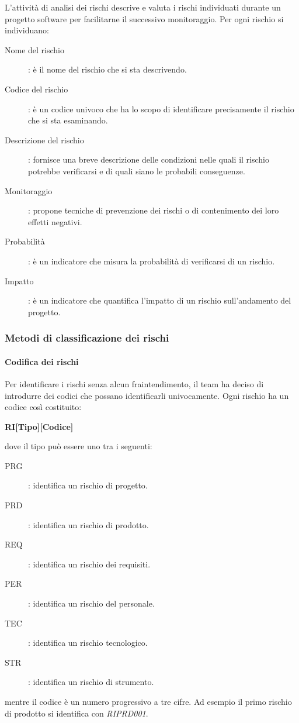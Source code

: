 \documentclass[../../norme-di-progetto.tex]{subfiles}
\begin{document}
L'attività di analisi dei rischi descrive e valuta i rischi individuati durante un progetto software per facilitarne il successivo monitoraggio. Per ogni rischio si individuano:
\begin{description}
  \item[Nome del rischio]: è il nome del rischio che si sta descrivendo.
  \item[Codice del rischio]: è un codice univoco che ha lo scopo di identificare precisamente il rischio che si sta esaminando.
  \item[Descrizione del rischio]: fornisce una breve descrizione delle condizioni nelle quali il rischio potrebbe verificarsi e di quali siano le probabili conseguenze.
  \item[Monitoraggio]: propone tecniche di prevenzione dei rischi o di contenimento dei loro effetti negativi.
  \item[Probabilità]: è un indicatore che misura la probabilità di verificarsi di un rischio.
  \item[Impatto]: è un indicatore che quantifica l'impatto di un rischio sull'andamento del progetto.
\end{description}

\subsubsection{Metodi di classificazione dei rischi}%
\label{subs:metodi_di_classificazione_dei_rischi}

\paragraph{Codifica dei rischi}%
\label{par:codifica_dei_rischi}

Per identificare i rischi senza alcun fraintendimento, il team ha deciso di introdurre dei codici che possano identificarli univocamente.
Ogni rischio ha un codice così costituito:
\begin{center}
  \textbf{RI[Tipo][Codice]}
\end{center}
dove il tipo può essere uno tra i seguenti:
\begin{description}
  \item [PRG]: identifica un rischio di progetto.
  \item [PRD]: identifica un rischio di prodotto.
  \item [REQ]: identifica un rischio dei requisiti.
  \item [PER]: identifica un rischio del personale.
  \item [TEC]: identifica un rischio tecnologico.
  \item [STR]: identifica un rischio di strumento.
\end{description}
mentre il codice è un numero progressivo a tre cifre. Ad esempio il primo rischio di prodotto si identifica con \textit{RIPRD001}.
\end{document}
